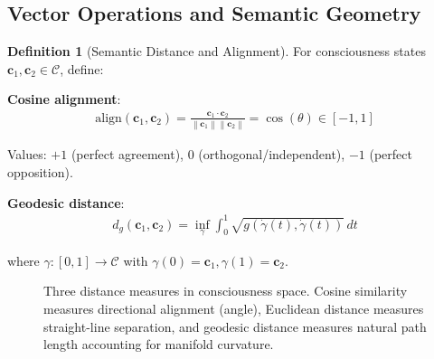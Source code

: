 \documentclass[11pt,a4paper]{article}
\theoremstyle{definition}
\newtheorem{definition}{Definition}[section]
\theoremstyle{remark}
\newcommand{\CC}{\mathcal{C}}
\newcommand{\cc}{\mathbf{c}}
\newcommand{\norm}[1]{\left\|#1\right\|}
\begin{document}
\subsection{Vector Operations and Semantic Geometry}

\begin{definition}[Semantic Distance and Alignment]
For consciousness states \(\cc_1, \cc_2 \in \CC\), define:

\textbf{Cosine alignment}:
\begin{align}
\text{align}(\cc_1, \cc_2) = \frac{\cc_1 \cdot \cc_2}{\norm{\cc_1} \norm{\cc_2}} = \cos(\theta) \in [-1, 1]
\end{align}

Values: \(+1\) (perfect agreement), \(0\) (orthogonal/independent), \(-1\) (perfect opposition).

\textbf{Geodesic distance}:
\begin{align}
d_g(\cc_1, \cc_2) = \inf_{\gamma} \int_0^1 \sqrt{g(\dot{\gamma}(t), \dot{\gamma}(t))} \, dt
\end{align}

where \(\gamma: [0,1] \to \CC\) with \(\gamma(0) = \cc_1, \gamma(1) = \cc_2\).
\end{definition}

\begin{figure}[H]
\centering
{}
\caption{Three distance measures in consciousness space. Cosine similarity measures directional alignment (angle), Euclidean distance measures straight-line separation, and geodesic distance measures natural path length accounting for manifold curvature.}
\label{fig:distance_measures}
\end{figure}
\end{document}

